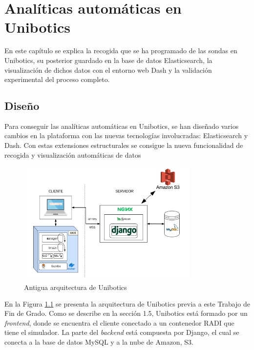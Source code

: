 \chapter{Analíticas automáticas en Unibotics}
\label{analiticas}
En este capítulo se explica la recogida que se ha programado de las sondas en Unibotics, su posterior guardado en la base de datos Elasticsearch, la visualización de dichos datos con el entorno web Dash y la validación experimental del proceso completo.

\section{Diseño}
Para conseguir las analíticas automáticas en Unibotics, se han diseñado varios cambios en la plataforma con las nuevas tecnologías involucradas: Elasticsearch y Dash. Con estas extensiones estructurales se consigue la nueva funcionalidad de recogida y visualización automáticas de datos \\

\begin{figure}[H]
    \centering
    \includegraphics[width=9cm, keepaspectratio]{img/grafico.png}
    \caption{Antigua arquitectura de Unibotics}
    \label{fig:grafico}
\end{figure}

En la Figura \ref{fig:grafico} se presenta la arquitectura de Unibotics previa a este Trabajo de Fin de Grado. Como se describe en la sección 1.5, Unibotics está formado por un \textit{frontend}, donde se encuentra el cliente conectado a un contenedor RADI que tiene el simulador. La parte del \textit{backend} está compuesta por Django, el cual se conecta a la base de datos MySQL y a la nube de Amazon, S3.

